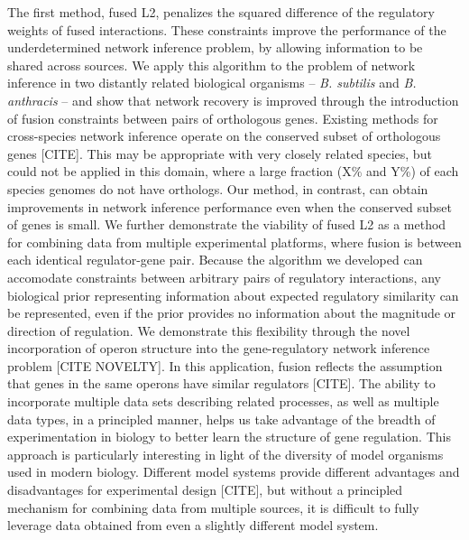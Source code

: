 \documentclass[11pt]{article}
\begin{document}
 The first method, fused L2, penalizes the squared difference of the regulatory weights of fused interactions. These constraints improve the performance of the underdetermined network inference problem, by allowing information to be shared across sources. We apply this algorithm to the problem of network inference in two distantly related biological organisms -- \textit{B. subtilis} and \textit{B. anthracis} -- and show that network recovery is improved through the introduction of fusion constraints between pairs of orthologous genes. Existing methods for cross-species network inference operate on the conserved subset of orthologous genes [CITE]. This may be appropriate with very closely related species, but could not be applied in this domain, where a large fraction (X\% and Y\%) of each species genomes do not have orthologs. Our method, in contrast, can obtain improvements in network inference performance even when the conserved subset of genes is small. We further demonstrate the viability of fused L2 as a method for combining data from multiple experimental platforms, where fusion is between each identical regulator-gene pair. Because the algorithm we developed can accomodate constraints between arbitrary pairs of regulatory interactions, any biological prior representing information about expected regulatory similarity can be represented, even if the prior provides no information about the magnitude or direction of regulation. We demonstrate this flexibility through the novel incorporation of operon structure into the gene-regulatory network inference problem [CITE NOVELTY]. In this application, fusion reflects the assumption that genes in the same operons have similar regulators [CITE]. The ability to incorporate multiple data sets describing related processes, as well as multiple data types, in a principled manner, helps us take advantage of the breadth of experimentation in biology to better learn the structure of gene regulation. This approach is particularly interesting in light of the diversity of model organisms used in modern biology. Different model systems provide different advantages and disadvantages for experimental design [CITE], but without a principled mechanism for combining data from multiple sources, it is difficult to fully leverage data obtained from even a slightly different model system. 
\end{document}
